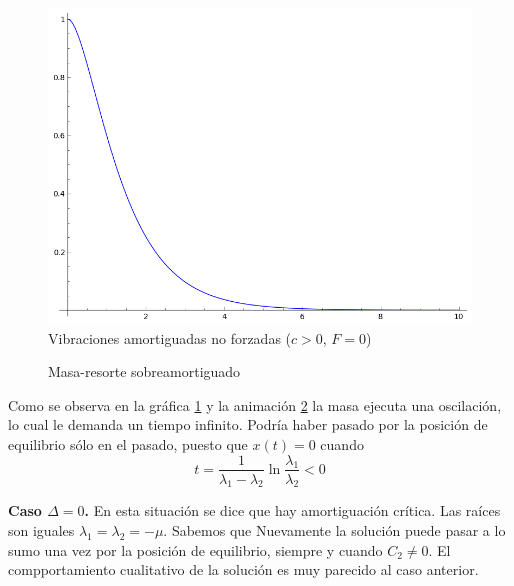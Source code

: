 \begin{figure}[h]
\begin{center}
\includegraphics[scale=.2]{imagenes/sobreamortiguado.png}
\caption{ Vibraciones amortiguadas no forzadas ($c>0$, $F=0$) }\label{fig:VibrAmorNoFor}
\end{center}
\end{figure}



\begin{figure}[h]
\begin{center}
\vspace{.5cm}
\caption{Masa-resorte sobreamortiguado}\label{ani:VibrAmorNoFor}
\end{center}
\end{figure}

Como se observa en la gráfica \ref{fig:VibrAmorNoFor} y la animación \ref{ani:VibrAmorNoFor}
la masa ejecuta una oscilación, lo cual le demanda un tiempo infinito. Podría
haber pasado por la posición de equilibrio sólo en el pasado,
puesto que $x(t)=0$ cuando
\[\boxed{t=\frac{1}{\lambda_1-\lambda_2}\ln\frac{\lambda_1}{\lambda_2}<0}\]


\noindent\textbf{Caso $\Delta=0$.} En esta situación se dice que hay amortiguación crítica. Las raíces son iguales $\lambda_1=\lambda_2=-\mu$. Sabemos que
Nuevamente la solución puede pasar a lo sumo una vez por la posición de equilibrio, siempre y cuando
$C_2\neq 0$. El compportamiento cualitativo de la solución es muy parecido al caso anterior.


